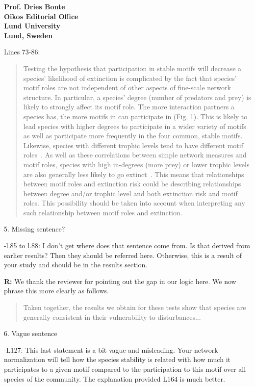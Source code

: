 \documentclass[12pt]{letter}
\begin{document}
\begin{letter}{\bf Prof. Dries Bonte\\
Oikos Editorial Office \\
Lund University \\
Lund, Sweden}
        
        Lines 73-86:
      
        \begin{quotation}
            Testing the hypothesis that participation in stable motifs will decrease a species' likelihood of extinction is complicated by the fact that species' motif roles are not independent of other aspects of fine-scale network structure. 
            In particular, a species' degree (number of predators and prey) is likely to strongly affect its motif role.
            The more interaction partners a species has, the more motifs in can participate in (Fig. 1).
            This is likely to lead species with higher degrees to participate in a wider variety of motifs as well as participate more frequently in the four common, stable motifs.
            Likewise, species with different trophic levels tend to have different motif roles~\citep{Cirtwill2018EcolLett}.
            As well as these correlations between simple network measures and motif roles, species with high in-degrees (more prey) or lower trophic levels are also generally less likely to go extinct~\citep{Cirtwill2018FoodWebs}.
            This means that relationships between motif roles and extinction risk could be describing relationships between degree and/or trophic level and both extinction risk and motif roles.
            This possibility should be taken into account when interpreting any such relationship between motif roles and extinction.
        \end{quotation}
      

    5. Missing sentence?

      -l.85 to l.88: I don't get where does that sentence come from. Is that derived from earlier results? Then they should be referred here. Otherwise, this is a result of your study and should be in the results section.

      \textbf{R:} 
     We thank the reviewer for pointing out the gap in our logic here. We now phrase this more clearly as follows.
      
     \begin{quotation}
         Taken together, the results we obtain for these tests show that species are generally consistent in their vulnerability to disturbances...
     \end{quotation}



    6. Vague sentence

      -L127: This last statement is a bit vague and misleading. Your network normalization will tell how the species stability is related with how much it participates to a given motif compared to the participation to this motif over all species of the community. The explanation provided L164 is much better.


\end{letter}
\end{document}
